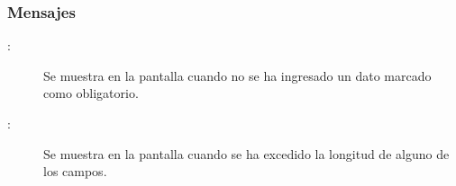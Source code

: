 \subsubsection{Mensajes}

	
\begin{description}
	\item[ :] Se muestra en la pantalla  cuando no se ha ingresado un dato marcado como obligatorio.
	\item[ :] Se muestra en la pantalla  cuando se ha excedido la longitud de alguno de los campos.
\end{description}
